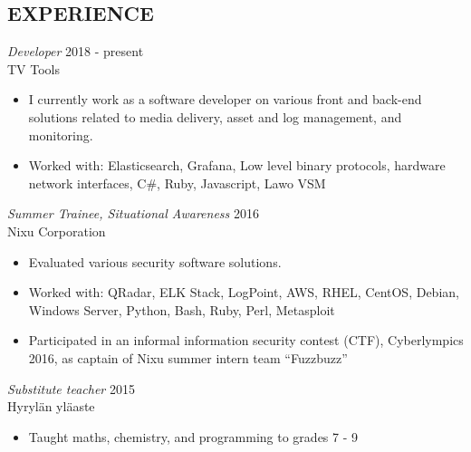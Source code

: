 \documentclass[margin, 10pt]{res} %
\begin{document}
\begin{resume}

%
%

 
\section{EXPERIENCE}

{\sl Developer} \hfill 2018 - present \\
TV Tools
\begin{itemize} \itemsep -2pt %
\item I currently work as a software developer on various front and back-end solutions related to media delivery, asset and log management, and monitoring.
\item Worked with: Elasticsearch, Grafana, Low level binary protocols, hardware network interfaces, C\#, Ruby, Javascript, Lawo VSM
\end{itemize}

{\sl Summer Trainee, Situational Awareness} \hfill 2016\\
Nixu Corporation
\begin{itemize} \itemsep -2pt %
\item Evaluated various security software solutions.
\item Worked with: QRadar, ELK Stack, LogPoint, AWS, RHEL, CentOS, Debian, Windows Server, Python, Bash, Ruby, Perl, Metasploit
\item Participated in an informal information security contest (CTF), Cyberlympics 2016, as captain of Nixu summer intern team ``Fuzzbuzz''  
\end{itemize}

{\sl Substitute teacher} \hfill 2015\\
Hyrylän yläaste
\begin{itemize} \itemsep -2pt %
\item Taught maths, chemistry, and programming to grades 7 - 9
\end{itemize}

  


\end{resume}
\end{document}
